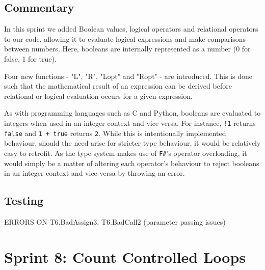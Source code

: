 \documentclass[a4paper, oneside, 11pt]{report}
\begin{document}
    \subsection{Commentary}
    In this sprint we added Boolean values, logical operators and relational operators to our code, allowing it to evaluate logical expressions and make comparisons between numbers.
    Here, booleans are internally represented as a number (0 for false, 1 for true).

    Four new functions - "L", "R", "Lopt" and "Ropt" - are introduced.
    This is done such that the mathematical result of an expression can be derived before relational or logical evaluation occurs for a given expression.

    As with programming languages such as C and Python, booleans are evaluated to integers when used in an integer context and vice versa.
    For instance, \verb|!1| returns \verb|false| and \verb|1 + true| returns \verb|2|.
    While this is intentionally implemented behaviour, should the need arise for stricter type behaviour, it would be relatively easy to retrofit.
    As the type system makes use of \verb|F#|'s operator overloading, it would simply be a matter of altering each operator's behaviour to reject booleans in an integer context and vice versa by throwing an error.

    \subsection{Testing}
    ERRORS ON T6.BadAssign3, T6.BadCall2 (parameter passing issues)
    \clearpage
    \section{Sprint 8: Count Controlled Loops}
\end{document}
